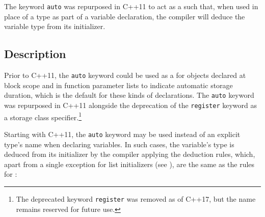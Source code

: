 


\label{auto-variables}
\label{auto-feature}
\setcounter{table}{0}
\setcounter{footnote}{0}
\setcounter{lstlisting}{0}

The keyword \lstinline!auto! was repurposed in C++11 to act as a  such that, when used in place of a type as part of a variable declaration, the compiler will deduce the variable
type from its initializer.

\subsection[Description]{Description}\label{description}

Prior to
C++11, the \lstinline!auto! keyword could be used as a  for objects declared at block scope and in function
parameter lists to indicate automatic storage duration, which is the
default for these kinds of declarations. The \lstinline!auto! keyword was
repurposed in C++11 alongside the deprecation of the \lstinline!register! keyword as a storage class
  specifier.\footnote{The deprecated keyword \lstinline!register! was removed as of C++17, but the name remains reserved for future use.}
  
  Starting with C++11, the \lstinline!auto! keyword may be used instead of an explicit type's name
when declaring variables. In such cases, the variable's type is deduced
from its initializer by the compiler applying the  deduction rules, which, apart from a single exception for list
initializers (see ),
are the same as the rules for :

